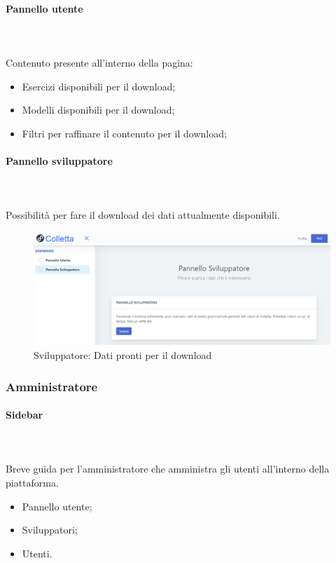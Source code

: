     \paragraph{Pannello utente}\mbox{}\\ \\
    Contenuto presente all'interno della pagina:
        \begin{itemize} 
        \item Esercizi disponibili per il download;
        \item Modelli disponibili per il download;
        \item Filtri per raffinare il contenuto per il download;
        \end{itemize}
        \newpage
    \paragraph{Pannello sviluppatore}\mbox{}\\ \\
    Possibilità per fare il download dei dati attualmente disponibili.
    \begin{figure}[H]
	\centering
	\includegraphics[width=17cm]{sez/img/sviluppatore/datipronti.png}
	\caption{Sviluppatore: Dati pronti per il download}\label{fig:1}
\end{figure}
    
\subsubsection{Amministratore}
\paragraph{Sidebar}\mbox{}\\ \\
	 Breve guida per l'amministratore che amministra gli utenti all'interno della piattaforma.
	 \begin{itemize}
	\item Pannello utente;
	\item Sviluppatori;
	\item Utenti.
\end{itemize}
